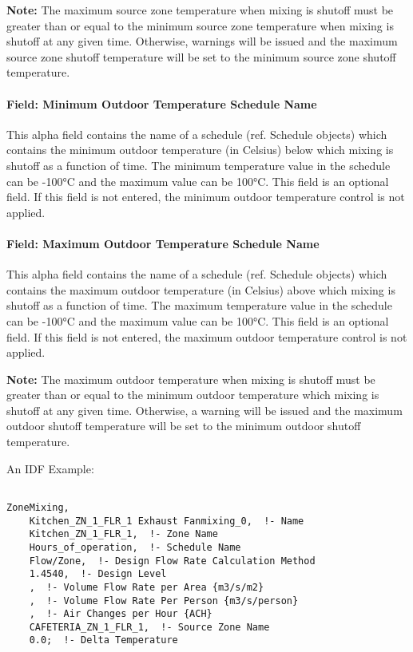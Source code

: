 \textbf{Note:} The maximum source zone temperature when mixing is shutoff must be greater than or equal to the minimum source zone temperature when mixing is shutoff at any given time. Otherwise, warnings will be issued and the maximum source zone shutoff temperature will be set to the minimum source zone shutoff temperature.

\paragraph{Field: Minimum Outdoor Temperature Schedule Name}\label{field-minimum-outdoor-temperature-schedule-name-2}

This alpha field contains the name of a schedule (ref. Schedule objects) which contains the minimum outdoor temperature (in Celsius) below which mixing is shutoff as a function of time. The minimum temperature value in the schedule can be -100°C and the maximum value can be 100°C. This field is an optional field. If this field is not entered, the minimum outdoor temperature control is not applied.

\paragraph{Field: Maximum Outdoor Temperature Schedule Name}\label{field-maximum-outdoor-temperature-schedule-name-2}

This alpha field contains the name of a schedule (ref. Schedule objects) which contains the maximum outdoor temperature (in Celsius) above which mixing is shutoff as a function of time. The maximum temperature value in the schedule can be -100°C and the maximum value can be 100°C. This field is an optional field. If this field is not entered, the maximum outdoor temperature control is not applied.

\textbf{Note:} The maximum outdoor temperature when mixing is shutoff must be greater than or equal to the minimum outdoor temperature which mixing is shutoff at any given time. Otherwise, a warning will be issued and the maximum outdoor shutoff temperature will be set to the minimum outdoor shutoff temperature.

An IDF Example:

\begin{lstlisting}

ZoneMixing,
    Kitchen_ZN_1_FLR_1 Exhaust Fanmixing_0,  !- Name
    Kitchen_ZN_1_FLR_1,  !- Zone Name
    Hours_of_operation,  !- Schedule Name
    Flow/Zone,  !- Design Flow Rate Calculation Method
    1.4540,  !- Design Level
    ,  !- Volume Flow Rate per Area {m3/s/m2}
    ,  !- Volume Flow Rate Per Person {m3/s/person}
    ,  !- Air Changes per Hour {ACH}
    CAFETERIA_ZN_1_FLR_1,  !- Source Zone Name
    0.0;  !- Delta Temperature
\end{lstlisting}

